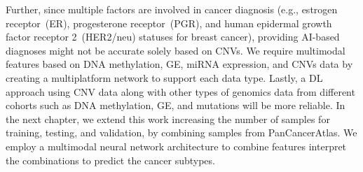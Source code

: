 \hspace*{3.5mm} Further, since multiple factors are involved in cancer diagnosis (e.g., estrogen receptor~(ER), progesterone receptor~(PGR), and human epidermal growth factor receptor 2~(HER2/neu) statuses for breast cancer), providing AI-based diagnoses might not be accurate solely based on CNVs. We require multimodal features based on DNA methylation, GE, miRNA expression, and CNVs data by creating a multiplatform network to support each data type. Lastly, a DL approach using CNV data along with other types of genomics data from different cohorts such as DNA methylation, GE, and mutations will be more reliable. In the next chapter, we extend this work increasing the number of samples for training, testing, and validation, by combining samples from PanCancerAtlas. We employ a multimodal neural network architecture to combine features interpret the combinations to predict the cancer subtypes. 
